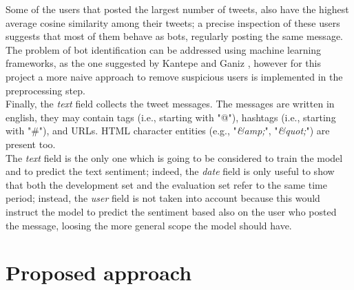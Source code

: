\documentclass[conference]{IEEEtran}
\begin{document}
Some of the users that posted the largest number of tweets, also have the highest average cosine similarity among their tweets; a precise inspection of these users suggests that most of them behave as bots, regularly posting the same message. The problem of bot identification can be addressed using machine learning frameworks, as the one suggested by Kantepe and Ganiz \cite{8093483}, however for this project a more naive approach to remove suspicious users is implemented in the preprocessing step. \\
Finally, the \textit{text} field collects the tweet messages. The messages are written in english, they may contain tags (i.e., starting with "@"), hashtags (i.e., starting with "\#"), and URLs. HTML character entities (e.g., "\textit{\&amp;}", "\textit{\&quot;}") are present too. \\
The \textit{text} field is the only one which is going to be considered to train the model and to predict the text sentiment; indeed, the \textit{date} field is only useful to show that both the development set and the evaluation set refer to the same time period; instead, the \textit{user} field is not taken into account because this would instruct the model to predict the sentiment based also on the user who posted the message, loosing the more general scope the model should have. 

\section{Proposed approach}
\end{document}
